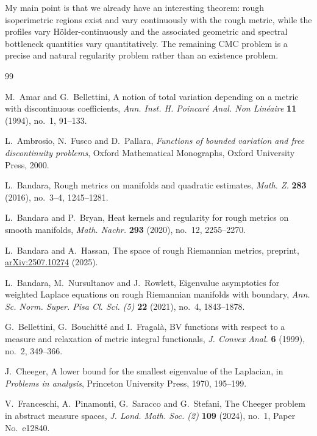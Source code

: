 \documentclass[11pt]{amsart}
\theoremstyle{definition}
\theoremstyle{remark}
\begin{document}
My main point is that we already have an interesting theorem: rough isoperimetric regions exist and vary continuously with the
rough metric, while the profiles vary H\"older-continuously and the associated
geometric and spectral bottleneck
quantities vary quantitatively.  The remaining CMC problem is a precise and
natural regularity problem rather than an existence problem.

\begin{thebibliography}{99}

M.~Amar and G.~Bellettini,
\newblock A notion of total variation depending on a metric with discontinuous
coefficients,
\newblock \emph{Ann. Inst. H. Poincar\'e Anal. Non Lin\'eaire} \textbf{11}
(1994), no.~1, 91--133.

L.~Ambrosio, N.~Fusco and D.~Pallara,
\newblock \emph{Functions of bounded variation and free discontinuity
problems},
\newblock Oxford Mathematical Monographs, Oxford University Press, 2000.

L.~Bandara,
\newblock Rough metrics on manifolds and quadratic estimates,
\newblock \emph{Math. Z.} \textbf{283} (2016), no.~3--4, 1245--1281.

L.~Bandara and P.~Bryan,
\newblock Heat kernels and regularity for rough metrics on smooth manifolds,
\newblock \emph{Math. Nachr.} \textbf{293} (2020), no.~12, 2255--2270.

L.~Bandara and A.~Hassan,
\newblock The space of rough Riemannian metrics,
\newblock preprint, \href{https://arxiv.org/abs/2507.10274}{arXiv:2507.10274}
(2025).

L.~Bandara, M.~Nursultanov and J.~Rowlett,
\newblock Eigenvalue asymptotics for weighted Laplace equations on rough
Riemannian manifolds with boundary,
\newblock \emph{Ann. Sc. Norm. Super. Pisa Cl. Sci. (5)} \textbf{22} (2021),
no.~4, 1843--1878.

G.~Bellettini, G.~Bouchitt\'e and I.~Fragal\`a,
\newblock BV functions with respect to a measure and relaxation of metric
integral functionals,
\newblock \emph{J. Convex Anal.} \textbf{6} (1999), no.~2, 349--366.

J.~Cheeger,
\newblock A lower bound for the smallest eigenvalue of the Laplacian,
\newblock in \emph{Problems in analysis}, Princeton University Press, 1970,
195--199.

V.~Franceschi, A.~Pinamonti, G.~Saracco and G.~Stefani,
\newblock The Cheeger problem in abstract measure spaces,
\newblock \emph{J. Lond. Math. Soc. (2)} \textbf{109} (2024), no.~1,
Paper No.~e12840.


\end{thebibliography}
\end{document}
